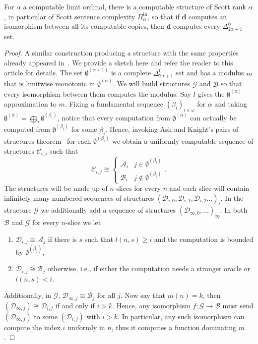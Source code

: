 \documentclass[10pt,a4paper]{amsart}
\newcommand\+[1]{\mathcal{#1}}
\renewcommand\*[1]{\mathbf{#1}}
\renewcommand\=[1]{\text{#1}}
\renewcommand\*[1]{\mathbf{#1}}
\newcommand{\A}{\mathcal{A}}
\newcommand{\B}{\mathcal{B}}
\newcommand{\Pinf}[1]{\Pi^{\mathrm{in}}_{#1}}
\newcommand{\nat}{\omega}
\begin{document}
 \begin{lemma}\label{thm:limithighforsr}For $\alpha$ a computable limit ordinal, there is a computable structure of Scott rank $\alpha$, in particular of Scott sentence complexity $\Pinf{\alpha}$, so that if $\*d$ computes an isomorphism between all its computable copies, then $\*d$ computes every $\Delta^0_{2\alpha+1}$ set.
 \end{lemma}
 \begin{proof}
   A similar construction producing a structure with the same properties already appeared in~\cite{csima2020}. We provide a sketch here and refer the reader to this article for details. The set $\emptyset^{(\alpha+1)}$ is a complete $\Delta^0_{2\alpha+1}$ set and has a modulus $m$ that is limitwise monotonic in $\emptyset^{(\alpha)}$. We will build structures $\+G$ and $\B$ so that every isomorphism between them computes the modulus. Say $l$ gives the $\emptyset^{(\alpha)}$ approximation to $m$. Fixing a fundamental sequence $(\beta_i)_{i\in \nat}$ for $\alpha$ and taking $\emptyset^{(\alpha)}=\bigoplus_i \emptyset^{(\beta_i)}$, notice that every computation from $\emptyset^{(\alpha)}$ can actually be computed from $\emptyset^{(\beta_i)}$ for some $\beta_i$. 
   Hence, invoking Ash and Knight's pairs of structures theorem~\cite{ash1990} for each $\emptyset^{(\beta_i)}$ we obtain a uniformly computable sequence of structures $\+C_{i,j}$ such that
   \[ \+C_{i,j}\cong\begin{cases} \A_i & j\in \emptyset^{(\beta_i)}\\
   \B_i & j\notin \emptyset^{(\beta_i)}\end{cases}.\]
   The structures will be made up of $n$-slices for every $n$ and each slice will contain infinitely many numbered sequences of structures $(\+D_{i,0},\+D_{i,1},\+D_{i,2}\dots)_i$. In the structure $\+G$ we additionally add a sequence of structures $(\+D_{\infty,0},\dots)_\infty$. In both $\B$ and $\+G$ for every $n$-slice we let
   \begin{enumerate}
     \item $\+D_{i,j}\cong \A_j$ if there is $s$ such that $l(n,s)\geq i$ and the computation is bounded by $\emptyset^{(\beta_j)}$,
   \item $\+D_{i,j}\cong \B_j$ otherwise, i.e., if either the computation needs a stronger oracle or $l(n,s)<i$.
   \end{enumerate}
   Additionally, in $\+G$, $\+D_{\infty,j}\cong \B_j$ for all $j$. Now say that $m(n)=k$, then $(\+D_{\infty,j})\cong \+D_{i,j}$ if and only if $i>k$. Hence, any isomorphism $f:\+G\to \B$ must send $(\+D_{\infty,j})$ to some $(\+D_{i,j})$ with $i>k$. In particular, any such isomorphism can compute the index $i$ uniformly in $n$, thus it computes a function dominating $m$.


\end{proof}
\end{document}
